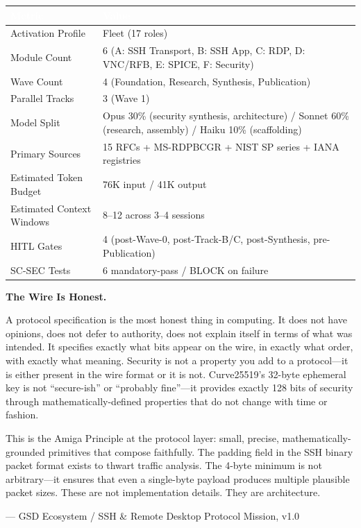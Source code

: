 \documentclass[11pt,letterpaper]{article}
\newcommand{\tableheader}[1]{\textbf{\sffamily\textcolor{white}{#1}}}
\begin{document}
\begin{center}
\begin{tabularx}{\textwidth}{L{5cm}X}
\toprule
{}
\tableheader{Metric} & \tableheader{Value} \\
\midrule
Activation Profile & Fleet (17 roles) \\
Module Count & 6 (A: SSH Transport, B: SSH App, C: RDP, D: VNC/RFB, E: SPICE, F: Security) \\
Wave Count & 4 (Foundation, Research, Synthesis, Publication) \\
Parallel Tracks & 3 (Wave 1) \\
Model Split & Opus 30\% (security synthesis, architecture) / Sonnet 60\% (research, assembly) / Haiku 10\% (scaffolding) \\
Primary Sources & 15 RFCs + MS-RDPBCGR + NIST SP series + IANA registries \\
Estimated Token Budget & 76K input / 41K output \\
Estimated Context Windows & 8--12 across 3--4 sessions \\
HITL Gates & 4 (post-Wave-0, post-Track-B/C, post-Synthesis, pre-Publication) \\
SC-SEC Tests & 6 mandatory-pass / BLOCK on failure \\
\bottomrule
\end{tabularx}
\end{center}

\vspace{2em}

\begin{quotebox}
\textbf{\sffamily The Wire Is Honest.}

\vspace{0.5em}

A protocol specification is the most honest thing in computing. It does not have opinions, does not defer to authority, does not explain itself in terms of what was intended. It specifies exactly what bits appear on the wire, in exactly what order, with exactly what meaning. Security is not a property you add to a protocol---it is either present in the wire format or it is not. Curve25519's 32-byte ephemeral key is not ``secure-ish'' or ``probably fine''---it provides exactly 128 bits of security through mathematically-defined properties that do not change with time or fashion.

This is the Amiga Principle at the protocol layer: small, precise, mathematically-grounded primitives that compose faithfully. The padding field in the SSH binary packet format exists to thwart traffic analysis. The 4-byte minimum is not arbitrary---it ensures that even a single-byte payload produces multiple plausible packet sizes. These are not implementation details. They are architecture.

\vspace{0.5em}
{\small\sffamily\textcolor{subtlegray}{--- GSD Ecosystem / SSH \& Remote Desktop Protocol Mission, v1.0}}
\end{quotebox}
\end{document}
